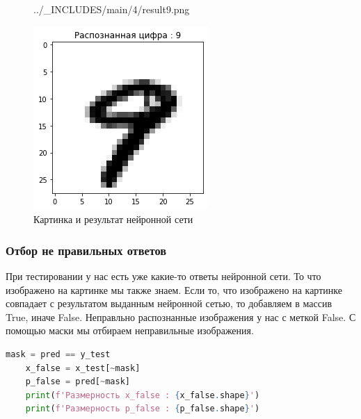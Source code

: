 \begin{figure}[!htp]
\begin{minipage}[h]{0.19\linewidth}
        {../_INCLUDES/main/4/result9.png}
    \end{minipage}
    \hfill
    \begin{minipage}[h]{0.19\linewidth}
        \centering
        \includegraphics[width=\linewidth]
        {../_INCLUDES/main/4/result10.png}
    \end{minipage}

    \caption{Картинка и результат нейронной сети}
    \label{fig:4_img_and_result}
\end{figure}



\subsubsection{Отбор не правильных ответов}

При тестировании у нас есть уже какие-то ответы нейронной сети. То что изображено на картинке мы также знаем. Если то, что изображено на картинке совпадает с результатом выданным нейронной сетью, то добавляем в массив True, иначе False. Неправльно распознанные изображения у нас с меткой False. С помощью маски мы отбираем неправильные изображения.

\begin{lstlisting}[language=Python,]
    mask = pred == y_test
    x_false = x_test[~mask]
    p_false = pred[~mask]
    print(f'Размерность x_false : {x_false.shape}')
    print(f'Размерность p_false : {p_false.shape}')
\end{lstlisting}

